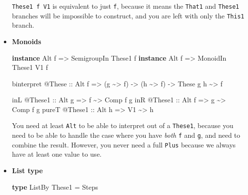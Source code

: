 \documentclass[]{article}
\newenvironment{Shaded}{}{}
\newcommand{\DataTypeTok}[1]{\textcolor[rgb]{0.56,0.13,0.00}{#1}}
\newcommand{\KeywordTok}[1]{\textcolor[rgb]{0.00,0.44,0.13}{\textbf{#1}}}
\newcommand{\NormalTok}[1]{#1}
\newcommand{\OperatorTok}[1]{\textcolor[rgb]{0.40,0.40,0.40}{#1}}
\newcommand{\OtherTok}[1]{\textcolor[rgb]{0.00,0.44,0.13}{#1}}
\begin{document}
\begin{itemize}
  \texttt{These1\ f\ V1} is equivalent to just \texttt{f}, because it means the
  \texttt{That1} and \texttt{These1} branches will be impossible to construct,
  and you are left with only the \texttt{This1} branch.
\item
  \textbf{Monoids}

\begin{Shaded}
\begin{Highlighting}[]
\KeywordTok{instance} \DataTypeTok{Alt}\NormalTok{ f }\OtherTok{=>} \DataTypeTok{SemigroupIn} \DataTypeTok{These1}\NormalTok{ f}
\KeywordTok{instance} \DataTypeTok{Alt}\NormalTok{ f }\OtherTok{=>} \DataTypeTok{MonoidIn}    \DataTypeTok{These1} \DataTypeTok{V1}\NormalTok{ f}

\NormalTok{binterpret }\OperatorTok{@}\DataTypeTok{These}
\OtherTok{    ::} \DataTypeTok{Alt}\NormalTok{ f}
    \OtherTok{=>}\NormalTok{ (g }\OperatorTok{\textasciitilde{}>}\NormalTok{ f)}
    \OtherTok{{-}>}\NormalTok{ (h }\OperatorTok{\textasciitilde{}>}\NormalTok{ f)}
    \OtherTok{{-}>} \DataTypeTok{These}\NormalTok{ g h }\OperatorTok{\textasciitilde{}>}\NormalTok{ f}

\NormalTok{inL   }\OperatorTok{@}\DataTypeTok{These1}\OtherTok{ ::} \DataTypeTok{Alt}\NormalTok{ g }\OtherTok{=>}\NormalTok{ f  }\OperatorTok{\textasciitilde{}>} \DataTypeTok{Comp}\NormalTok{ f g}
\NormalTok{inR   }\OperatorTok{@}\DataTypeTok{These1}\OtherTok{ ::} \DataTypeTok{Alt}\NormalTok{ f }\OtherTok{=>}\NormalTok{ g  }\OperatorTok{\textasciitilde{}>} \DataTypeTok{Comp}\NormalTok{ f g}
\NormalTok{pureT }\OperatorTok{@}\DataTypeTok{These1}\OtherTok{ ::} \DataTypeTok{Alt}\NormalTok{ h }\OtherTok{=>} \DataTypeTok{V1} \OperatorTok{\textasciitilde{}>}\NormalTok{ h}
\end{Highlighting}
\end{Shaded}

  You need at least \texttt{Alt} to be able to interpret out of a
  \texttt{These1}, because you need to be able to handle the case where you have
  \emph{both} \texttt{f} and \texttt{g}, and need to combine the result.
  However, you never need a full \texttt{Plus} because we always have at least
  one value to use.
\item
  \textbf{List type}

\begin{Shaded}
\begin{Highlighting}[]
\KeywordTok{type} \DataTypeTok{ListBy} \DataTypeTok{These1} \OtherTok{=} \DataTypeTok{Steps}
\end{Highlighting}
\end{Shaded}


\end{itemize}
\end{document}
